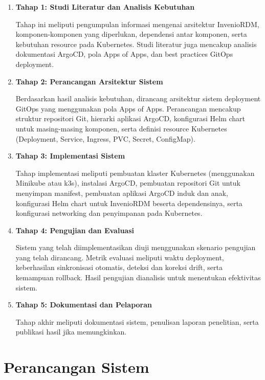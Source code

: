 \begin{enumerate}
    \item \textbf{Tahap 1: Studi Literatur dan Analisis Kebutuhan}
    
    Tahap ini meliputi pengumpulan informasi mengenai arsitektur InvenioRDM, komponen-komponen yang diperlukan, dependensi antar komponen, serta kebutuhan resource pada Kubernetes. Studi literatur juga mencakup analisis dokumentasi ArgoCD, pola Apps of Apps, dan best practices GitOps deployment.
    
    \item \textbf{Tahap 2: Perancangan Arsitektur Sistem}
    
    Berdasarkan hasil analisis kebutuhan, dirancang arsitektur sistem deployment GitOps yang menggunakan pola Apps of Apps. Perancangan mencakup struktur repositori Git, hierarki aplikasi ArgoCD, konfigurasi Helm chart untuk masing-masing komponen, serta definisi resource Kubernetes (Deployment, Service, Ingress, PVC, Secret, ConfigMap).
    
    \item \textbf{Tahap 3: Implementasi Sistem}
    
    Tahap implementasi meliputi pembuatan klaster Kubernetes (menggunakan Minikube atau k3s), instalasi ArgoCD, pembuatan repositori Git untuk menyimpan manifest, pembuatan aplikasi ArgoCD induk dan anak, konfigurasi Helm chart untuk InvenioRDM beserta dependensinya, serta konfigurasi networking dan penyimpanan pada Kubernetes.
    
    \item \textbf{Tahap 4: Pengujian dan Evaluasi}
    
    Sistem yang telah diimplementasikan diuji menggunakan skenario pengujian yang telah dirancang. Metrik evaluasi meliputi waktu deployment, keberhasilan sinkronisasi otomatis, deteksi dan koreksi drift, serta kemampuan rollback. Hasil pengujian dianalisis untuk menentukan efektivitas sistem.
    
    \item \textbf{Tahap 5: Dokumentasi dan Pelaporan}
    
    Tahap akhir meliputi dokumentasi sistem, penulisan laporan penelitian, serta publikasi hasil jika memungkinkan.
\end{enumerate}

\section{Perancangan Sistem}

